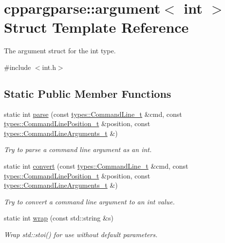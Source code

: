\hypertarget{structcppargparse_1_1argument_3_01int_01_4}{}\section{cppargparse\+:\+:argument$<$ int $>$ Struct Template Reference}
\label{structcppargparse_1_1argument_3_01int_01_4}


The argument struct for the int type.  




{\ttfamily \#include $<$int.\+h$>$}

\subsection*{Static Public Member Functions}
\begin{DoxyCompactItemize}
\item 
static int \hyperlink{structcppargparse_1_1argument_3_01int_01_4_a4b6383c72b1700ecd4718adba1325b0f}{parse} (const \hyperlink{types_8h_a80adf2418b7ce9fe616698efa7533ecf}{types\+::\+Command\+Line\+\_\+t} \&cmd, const \hyperlink{types_8h_a43b4f43f8940de1bf09ced6f1b668053}{types\+::\+Command\+Line\+Position\+\_\+t} \&position, const \hyperlink{types_8h_a003c660afe2ee9c6cc39aea966e8926d}{types\+::\+Command\+Line\+Arguments\+\_\+t} \&)
\begin{DoxyCompactList}\small\item\em Try to parse a command line argument as an int. \end{DoxyCompactList}\item 
static int \hyperlink{structcppargparse_1_1argument_3_01int_01_4_ada0c76b27ff8ca62c811a528a4e310dc}{convert} (const \hyperlink{types_8h_a80adf2418b7ce9fe616698efa7533ecf}{types\+::\+Command\+Line\+\_\+t} \&cmd, const \hyperlink{types_8h_a43b4f43f8940de1bf09ced6f1b668053}{types\+::\+Command\+Line\+Position\+\_\+t} \&position, const \hyperlink{types_8h_a003c660afe2ee9c6cc39aea966e8926d}{types\+::\+Command\+Line\+Arguments\+\_\+t} \&)
\begin{DoxyCompactList}\small\item\em Try to convert a command line argument to an int value. \end{DoxyCompactList}\item 
static int \hyperlink{structcppargparse_1_1argument_3_01int_01_4_a9aaa6d09e1e87523f1304a47f007e9eb}{wrap} (const std\+::string \&s)
\begin{DoxyCompactList}\small\item\em Wrap std\+::stoi() for use without default parameters. \end{DoxyCompactList}\end{DoxyCompactItemize}


